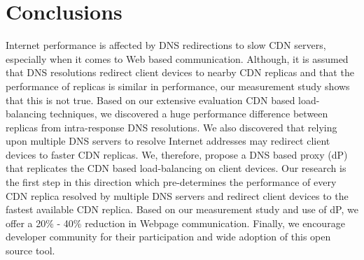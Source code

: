 \documentclass{llncs}
\begin{document}
\section{Conclusions}
\label{conclusions}

Internet performance is affected by DNS redirections to slow CDN servers, especially when it comes to Web based communication.
Although, it is assumed that DNS resolutions redirect client devices to nearby CDN replicas and that the performance of replicas is similar in performance, our measurement study shows that this is not true.
Based on our extensive evaluation CDN based load-balancing techniques, we discovered a huge performance difference between replicas from intra-response DNS resolutions.
We also discovered that relying upon multiple DNS servers to resolve Internet addresses may redirect client devices to faster CDN replicas.
We, therefore, propose a DNS based proxy (dP) that replicates the CDN based load-balancing on client devices.
Our research is the first step in this direction which pre-determines the performance of every CDN replica resolved by multiple DNS servers and redirect client devices to the fastest available CDN replica.
Based on our measurement study and use of dP, we offer a 20\% - 40\% reduction in Webpage communication.
Finally, we encourage developer community for their participation and wide adoption of this open source tool.




\end{document}
